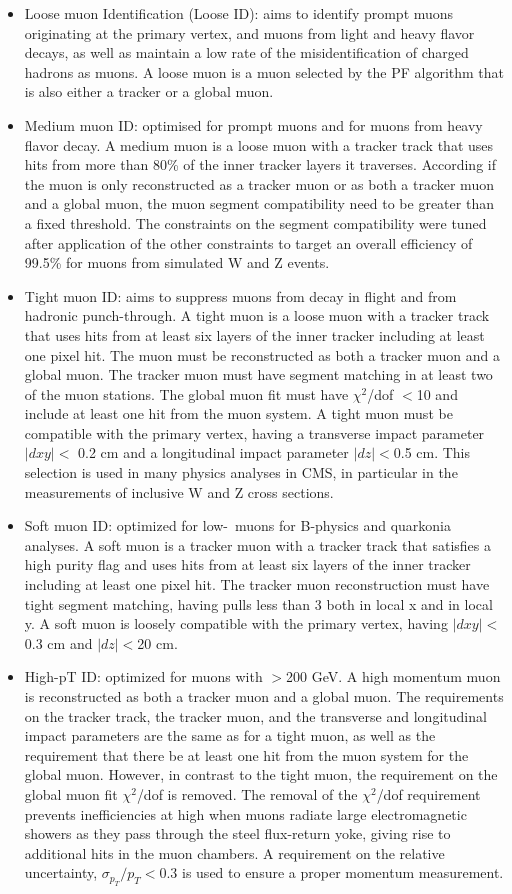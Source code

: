 \begin{itemize}
\item Loose muon Identification (Loose ID): aims to identify prompt muons originating at the primary vertex, and muons from light and heavy flavor decays, as well as maintain a low rate of the misidentification of charged hadrons as muons.  A loose muon is a muon selected by the PF algorithm that is also either a tracker or a global muon.
\item Medium muon ID: optimised for prompt muons and for muons from heavy flavor decay.  A medium muon is a loose muon with a tracker track that uses hits from more than 80\% of the inner tracker layers it traverses.  According if the muon is only reconstructed as a tracker muon or as both a tracker muon and a global muon, the
muon segment compatibility need to be greater than a fixed threshold. The  constraints  on  the  segment  compatibility  were  tuned  after  application  of  the other constraints to target an overall efficiency of 99.5\% for muons from simulated W and Z events.
\item Tight muon ID: aims  to  suppress  muons  from  decay  in  flight  and  from  hadronic punch-through.  A tight muon is a loose muon with a tracker track that uses hits from at least six layers of the inner tracker including at least one pixel hit. The muon must be reconstructed as both a tracker muon and a global muon. The tracker muon must have segment matching in at least two of the muon stations. The global muon fit must have $\chi^2$/dof $<$10 and include at least one hit from the muon system.  A tight muon must be compatible with the primary vertex, having a transverse impact parameter $|dxy| <$ 0.2 cm and a longitudinal impact parameter $|dz| <$0.5 cm. This selection is used in many physics analyses in CMS, in particular in the measurements of inclusive W and Z cross sections.
\item Soft muon ID: optimized for low-\pt\ muons for B-physics and quarkonia analyses. A soft muon is a tracker muon with a tracker track that satisfies a high purity flag and uses hits from at least six layers of the inner tracker including at least one pixel hit. The tracker muon reconstruction must have tight segment matching,  having pulls less than 3 both in local x and in local y.  A soft muon is loosely compatible with the primary vertex, having $|dxy| <$ 0.3 cm and $|dz| <$20 cm.
\item High-pT ID: optimized for muons with \pt $>$200 GeV.  A high momentum muon is reconstructed as both a tracker muon and a global muon. The requirements on the tracker track, the tracker muon, and the transverse and longitudinal impact parameters are the same as for a tight muon, as well as the requirement that there be at least one hit from the muon system for the global muon. However, in contrast to the tight muon, the requirement on the global muon fit $\chi^2$/dof is removed.  The removal of the $\chi^2$/dof requirement prevents inefficiencies at high \pt when muons radiate large electromagnetic showers as they pass through the steel flux-return yoke, giving rise to additional hits in the muon chambers. A requirement on the relative \pt uncertainty, $\sigma_{p_T}/p_T <0.3$ is used to ensure a proper momentum measurement.
\end{itemize}
